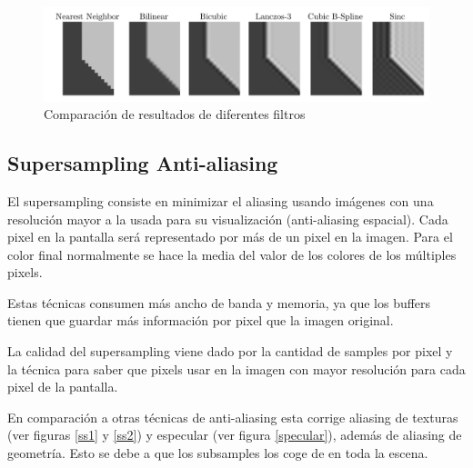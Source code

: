 \documentclass[withindex, glossary]{cam-thesis}
\begin{document}
\begin{figure}[!htbp]
    \includegraphics[width=\linewidth]{figures/comparison-filter.png}
    \caption{Comparación de resultados de diferentes filtros\cite{resampling2}}
\end{figure}

\subsection{Supersampling Anti-aliasing}

El supersampling consiste en minimizar el aliasing usando imágenes con una resolución mayor a la usada para su visualización (anti-aliasing espacial). Cada pixel en la pantalla será representado por más de un pixel en la imagen. Para el color final normalmente se hace la media del valor de los colores de los múltiples pixels\cite{Beets2000SupersamplingAA}.

Estas técnicas consumen más ancho de banda y memoria, ya que los buffers tienen que guardar más información por pixel que la imagen original.

La calidad del supersampling viene dado por la cantidad de samples por pixel y la técnica para saber que pixels usar en la imagen con mayor resolución para cada pixel de la pantalla.

En comparación a otras técnicas de anti-aliasing esta corrige aliasing de texturas (ver figuras \ref{ss1} y \ref{ss2}) y especular (ver figura \ref{specular}), además de aliasing de geometría. Esto se debe a que los subsamples los coge de en toda la escena.
\end{document}
